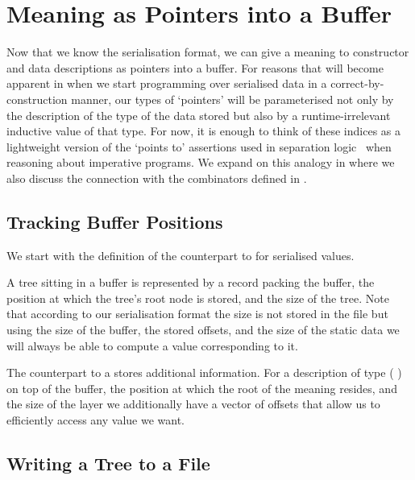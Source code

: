\section{Meaning as Pointers into a Buffer}\label{sec:pointers}

Now that we know the serialisation format, we can give a meaning
to constructor and data descriptions as pointers into a buffer.
%
For reasons that will become apparent in 
when we start programming over serialised data in a correct-by-construction
manner, our types of `pointers' will be parameterised not only
by the description of the type of the data stored but also by a
runtime-irrelevant inductive value of that type.
%
For now, it is enough to think of these indices as a lightweight
version of the `points to' assertions used in separation
logic~\cite{DBLP:conf/lics/Reynolds02}
when reasoning about imperative programs.
%
We expand on this analogy in  where we
also discuss the connection with the combinators defined
in .

\subsection{Tracking Buffer Positions}

We start with the definition of the counterpart to 
for serialised values.


A tree sitting in a buffer is represented
by a record packing the buffer, the position at which the tree's
root node is stored, and the size of the tree.
%
Note that according to our serialisation format the size is not stored
in the file but using the size of the buffer, the stored offsets,
and the size of the static data we will always
be able to compute a value corresponding to it.


The counterpart to a  stores additional information.
%
For a description of type (   )
on top of the buffer, the position at which the root of the meaning resides,
and the size of the layer we additionally have a vector of  offsets
that allow us to efficiently access any value we want.

\subsection{Writing a Tree to a File}\label{sec:writetofile}

